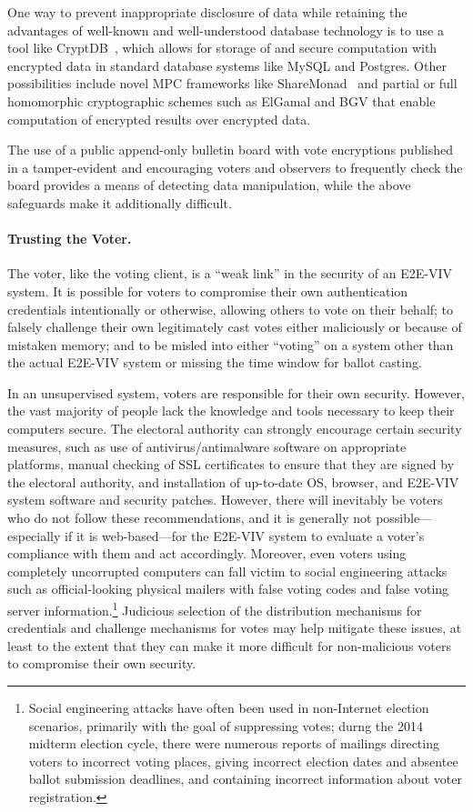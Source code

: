 One way to prevent inappropriate disclosure of data while retaining
the advantages of well-known and well-understood database technology
is to use a tool like CryptDB~\cite{Popa11}, which allows for storage
of and secure computation with encrypted data in standard database
systems like MySQL and Postgres. Other possibilities include novel MPC
frameworks like ShareMonad~\cite{Launchbury14} and partial or full
homomorphic cryptographic schemes such as ElGamal and BGV that enable
computation of encrypted results over encrypted data.

The use of a public append-only bulletin board with vote encryptions
published in a tamper-evident and encouraging voters and observers to
frequently check the board provides a means of detecting data
manipulation, while the above safeguards make it additionally
difficult.

\paragraph{Trusting the Voter.} The voter, like the voting client, is
a ``weak link'' in the security of an E2E-VIV system. It is possible
for voters to compromise their own authentication credentials
intentionally or otherwise, allowing others to vote on their behalf;
to falsely challenge their own legitimately cast votes either
maliciously or because of mistaken memory; and to be misled into
either ``voting'' on a system other than the actual E2E-VIV system or
missing the time window for ballot casting.

In an unsupervised system, voters are responsible for their own
security. However, the vast majority of people lack the knowledge and
tools necessary to keep their computers secure. The electoral
authority can strongly encourage certain security measures, such as
use of antivirus/antimalware software on appropriate platforms, manual
checking of SSL certificates to ensure that they are signed by the
electoral authority, and installation of up-to-date OS, browser, and
E2E-VIV system software and security patches. However, there will
inevitably be voters who do not follow these recommendations, and it
is generally not possible---especially if it is web-based---for the
E2E-VIV system to evaluate a voter's compliance with them and act
accordingly.  Moreover, even voters using completely uncorrupted
computers can fall victim to social engineering attacks such as
official-looking physical mailers with false voting codes and false
voting server information.\footnote{Social engineering attacks have
  often been used in non-Internet election scenarios, primarily with
  the goal of suppressing votes; durng the 2014 midterm election
  cycle, there were numerous reports of mailings directing voters to
  incorrect voting places, giving incorrect election dates and
  absentee ballot submission deadlines, and containing incorrect
  information about voter registration.}  Judicious selection of the
distribution mechanisms for credentials and challenge mechanisms for
votes may help mitigate these issues, at least to the extent that they
can make it more difficult for non-malicious voters to compromise
their own security.

